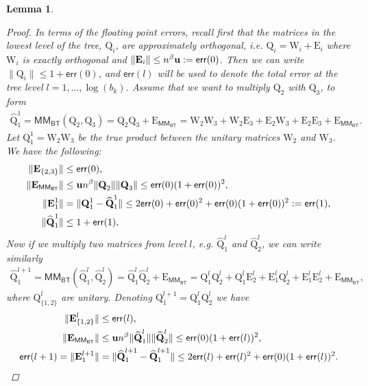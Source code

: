 \documentclass{article}
\newtheorem{lemma}{Lemma}[section]
\newcommand\matE{\boldsymbol{\mathrm{E}}}
\newcommand\matQ{\boldsymbol{\mathrm{Q}}}
\newcommand\matW{\boldsymbol{\mathrm{W}}}
\newcommand\matQhat{\widehat{\boldsymbol{\mathrm{Q}}}}
\newcommand{\umach}{\textbf{\textup{u}}}
\newcommand{\BTMM}{\mathsf{MM_{BT}}}
\newcommand{\cmm}{\beta}
\newcommand{\err}{\mathsf{err}}
\begin{document}
\begin{lemma}
\begin{proof}
        In terms of the floating point errors, recall first that the matrices in the lowest level of the tree, $\matQ_i$, are approximately orthogonal, i.e. $\matQ_i=\matW_i+\matE_i$ where $\matW_i$ is exactly orthogonal and $\|\matE_i\|\leq n^\cmm\umach:=\err(0)$. Then we can write $\|\matQ_i\|\leq 1+\err(0)$, and $\err(l)$ will be used to denote the total error at the tree level $l=1,\ldots,\log(b_k)$. 
        Assume that we want to multiply $\matQ_2$ with $\matQ_3$, to form \begin{align*}
            \matQhat^{1}_{1}=\BTMM(\matQ_2,\matQ_3) = 
            \matQ_2\matQ_3 + \matE_{\BTMM}
            = 
            \matW_2\matW_3 + \matW_2\matE_3+\matE_2\matW_3+\matE_2\matE_3+\matE_{\BTMM}.
        \end{align*}
        Let $\matQ_1^1=\matW_2\matW_3$ be the true product between the unitary matrices $\matW_2$ and $\matW_3$.
        We have the following:
        \begin{align*}
            \|\matE_{\{2,3\}}\| &\leq \err(0),
            \\
            \|\matE_{\BTMM}\| &\leq \umach n^{\cmm}\|\matQ_2\|\|\matQ_3\|\leq \err(0)(1+\err(0))^2,
            \\
            \|\matE_1^1\| &= \|\matQ_1^1-\matQhat_1^1\|
            \leq 2\err(0)+\err(0)^2+\err(0)(1+\err(0))^2:=\err(1),
            \\
            \|\matQhat_1^1\| &\leq 1+\err(1),
        \end{align*}
        Now if we multiply two matrices from level $l$, e.g. $\matQhat_1^l$ and $\matQhat_2^l$, we can write similarly
        \begin{align*}
            \matQhat^{l+1}_{1}=\BTMM(\matQhat_1^l,\matQhat_2^l) = 
            \matQhat_1^l\matQhat_2^l + \matE_{\BTMM}
            = 
            \matQ_1^l\matQ_2^l + \matQ_1^l\matE_2^l+\matE_1^l\matQ_2^l+\matE_1^l\matE_2^l+\matE_{\BTMM},
        \end{align*}
        where $\matQ_{\{1,2\}}^l$ are unitary. Denoting $\matQ_1^{l+1}=\matQ_1^l\matQ_2^l$
        we have
        \begin{align*}
            \|\matE_{\{1,2\}}^l\| &\leq \err(l),
            \\
            \|\matE_{\BTMM}\| &\leq \umach n^{\cmm}\|\matQhat_1^l\|\|\matQhat_2^l\|\leq \err(0)(1+\err(l))^2,
            \\
            \err(l+1) = \|\matE_1^{l+1}\| &= \|\matQhat_1^{l+1}-\matQhat_1^{l+1}\|
            \leq 2\err(l)+\err(l)^2+\err(0)(1+\err(l))^2.

\end{align*}
\end{proof}
\end{lemma}
\end{document}
